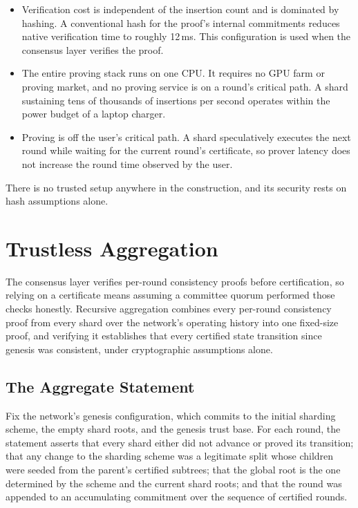 \begin{itemize}
    \item Verification cost is independent of the insertion count and is dominated by hashing. A conventional hash for the proof's internal commitments reduces native verification time to roughly 12\,ms. This configuration is used when the consensus layer verifies the proof.

    \item The entire proving stack runs on one CPU. It requires no GPU farm or proving market, and no proving service is on a round's critical path. A shard sustaining tens of thousands of insertions per second operates within the power budget of a laptop charger.

    \item Proving is off the user's critical path. A shard speculatively executes the next round while waiting for the current round's certificate, so prover latency does not increase the round time observed by the user.
\end{itemize}

There is no trusted setup anywhere in the construction, and its security rests on hash assumptions alone.

\section{Trustless Aggregation}\label{sec:trustless-agg}

The consensus layer verifies per-round consistency proofs before certification, so relying on a certificate means assuming a committee quorum performed those checks honestly. Recursive aggregation combines every per-round consistency proof from every shard over the network's operating history into one fixed-size proof, and verifying it establishes that every certified state transition since genesis was consistent, under cryptographic assumptions alone.

\subsection{The Aggregate Statement}

Fix the network's genesis configuration, which commits to the initial sharding scheme, the empty shard roots, and the genesis trust base. For each round, the statement asserts that every shard either did not advance or proved its transition; that any change to the sharding scheme was a legitimate split whose children were seeded from the parent's certified subtrees; that the global root is the one determined by the scheme and the current shard roots; and that the round was appended to an accumulating commitment over the sequence of certified rounds.

